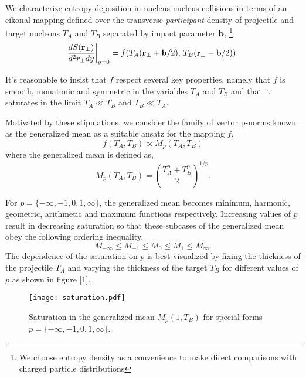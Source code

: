 \documentclass[aps,prl,reprint,amsmath,nofootinbib]{revtex4-1}
\begin{document}
We characterize entropy deposition in nucleus-nucleus collisions in terms of an eikonal mapping defined over the transverse \emph{participant} density 
of projectile and target nucleons $T_A$ and $T_B$ separated by impact parameter ${\bf b}$,
\footnote{We choose entropy density as a convenience to make direct comparisons with charged particle distributions}
\begin{equation}
  \frac{dS({\bf r}_\perp)}{d^2r_\perp dy} \biggr \rvert_{y=0}  = f(T_A({\bf r}_\perp + {\bf b}/2),\,T_B({\bf r}_\perp - {\bf b}/2)).
\end{equation}

It's reasonable to insist that $f$ respect several key properties, namely that $f$ is smooth, monatonic and symmetric in 
the variables $T_A$ and $T_B$ and that it saturates in the limit $T_A \ll T_B$ and $T_B \ll T_A$.

Motivated by these stipulations, we consider the family of vector p-norms known as the generalized mean as a suitable ansatz for the mapping $f$,
\begin{equation}
 \label{generalized mean ansatz}
 f(T_A, T_B) \propto M_p(T_A,T_B) 
\end{equation}
where the generalized mean is defined as,
\begin{equation}
 \label{generalized mean}
 M_p(T_A,T_B) = \left( \frac{T_A^p + T_B^p}{2} \right)^{1/p}.
\end{equation}

For $p = \{-\infty,-1,0,1,\infty\}$, the generalized mean becomes minimum, harmonic, geometric, arithmetic and maximum functions respectively. Increasing 
values of $p$ result in decreasing saturation so that these subcases of the generalized mean obey the following ordering inequality, 
\begin{equation}
 M_{-\infty} \le M_{-1} \le M_{0} \le M_{1} \le M_{\infty}.
\end{equation}
The dependence of the saturation on $p$ is best visualized by fixing the thickness of the projectile $T_A$ and varying the thickness of the target $T_B$ for 
different values of $p$ as shown in figure [1].
\begin{figure}[b]
 \texttt{[image: saturation.pdf]}
 \caption{Saturation in the generalized mean $M_p(1,T_B)$ for special forms $p=\{-\infty, -1, 0, 1, \infty\}$.}
\end{figure}
\end{document}
